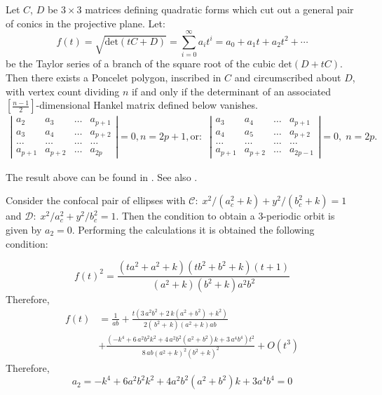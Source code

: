 Let $C$, $D $ be $3\times 3$ matrices defining quadratic forms which cut out a general pair of conics in the projective plane. Let:
\[f(t)=\sqrt{\mathrm{det}(tC+D)}=\sum_{i=0}^\infty a_it^i=a_0+a_1t+a_2t^2+\cdots
 \]
 be the Taylor series of a branch of the square root of the cubic 
$\mathrm{det}(D+tC)$.
 Then there exists a Poncelet polygon, inscribed in 
$C$ and circumscribed about 
$D$, with vertex count dividing $n$
 if and only if the determinant of an associated 
$[\frac{n-1}{2}]$-dimensional Hankel matrix defined below vanishes. 
 {\small 
 \begin{align*}
     \left|\begin{matrix} a_2 &a_3 &\ldots & a_{p+1}\\
     a_3 & a_4&\ldots & a_{p+2}\\
     \ldots & \ldots & \ldots &\ldots\\
     a_{p+1}& a_{p+2}&\ldots & a_{2p}
     \end{matrix}\right|=0, n=2p+1, \mathrm{or}:\;\;  \left|\begin{matrix} a_3 &a_4 &\ldots & a_{p+1}\\
     a_4 & a_5&\ldots & a_{p+2}\\
     \ldots & \ldots & \ldots &\ldots\\
     a_{p+1}& a_{p+2}&\ldots & a_{2p-1}
     \end{matrix}\right|=0,\; n=2p.
 \end{align*}
 }
 
 The result above can be found in \cite[Chap. 4]{drag_milena2011}. See also \cite{oliver-2021}.
 
 Consider the confocal pair of ellipses   with $\mathcal{C}: \; x^2/(a_c^2+k)+y^2/(b_c^2+k)=1$ and $\mathcal{D}:\;  x^2/a_c^2+y^2/b_c^2=1$.
  Then the condition to obtain a 3-periodic orbit is given by $a_2=0$. Performing the calculations it is obtained the following condition:  
  
 \[f(t)^2= {\frac { \left( t{a}^{2}+{a}^{2}+k \right)  \left( t{b}^{2}+{b}^{2}+k
 \right)  \left( t+1 \right) }{ \left( {a}^{2}+k \right)  \left( {b}^{
2}+k \right) {a}^{2}{b}^{2}}}\]
Therefore,
{\small  
\begin{align*}
f(t)&= {\frac {1}{ab}}+{\frac {t \left( 3\,{a}^{2}{b}^{2}+2\,k \left( {a}^{2}
+{b}^{2} \right) +{k}^{2} \right) }{ 2\left( \,{b}^{2}+\,k \right) 
 \left( {a}^{2}+k \right) ab}}\\
 &+{\frac { \left( -{k}^{4}+6\,{a}^{2}{b}^
{2}{k}^{2}+4\,{a}^{2}{b}^{2} \left( {a}^{2}+{b}^{2} \right) k+3\,{a}^{
4}{b}^{4} \right) {t}^{2}}{8\,ab \left( {a}^{2}+k \right) ^{2} \left( 
{b}^{2}+k \right) ^{2}}}
 +O(t^3)    
\end{align*}
}
Therefore,
 \[a_2=-k^4 + 6a^2b^2k^2 + 4a^2b^2(a^2 + b^2)k + 3a^4b^4=0\]
 
